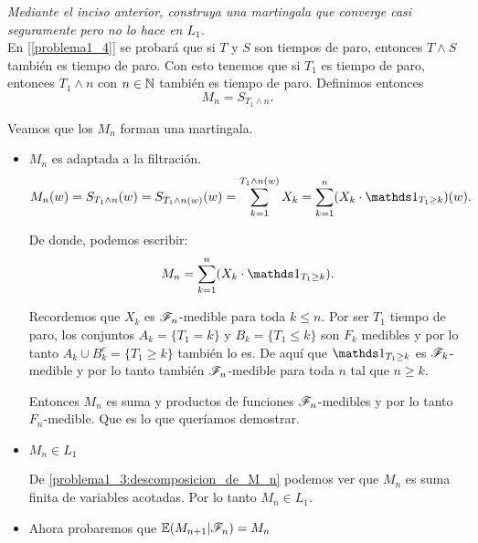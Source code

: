 \emph
{	
	Mediante el inciso anterior, construya una martingala que converge 
	casi seguramente pero no lo hace en $L_1$.\\
}
\afterstatement	
	En [\ref{problema1_4}] se probará que si $T$ y $S$ son tiempos de paro, entonces $T\wedge S$ también 
	es tiempo de paro. Con esto tenemos que si $T_1$ es tiempo de paro, entonces $T_1 \wedge n$ con 
	$n \in \mathbb{N}$ también es tiempo de paro. Definimos entonces 
	$$M_n = S_{T_1 \wedge n}.$$
	
	Veamos que los $M_n$ forman una martingala.
	
	\begin{itemize}
		\item 
			$M_n$ es adaptada a la filtración.
			\begin{align}
				M_n(w) = S_{T_1 \wedge n}(w) = 
				S_{T_1 \wedge n (w)}(w) = 
				\sum_{k=1}^{T_1 \wedge n (w)} X_k = 
				\sum_{k=1}^{n} (X_k \cdot \indic_{T_1 \geq k})(w).
			\end{align}
			
			De donde, podemos escribir:
			\begin{align}\label{problema1_3:descomposicion_de_M_n}
				M_n = \sum_{k=1}^{n} (X_k \cdot \indic_{T_1 \geq k}).
			\end{align}\pn							 		
			
			Recordemos que $X_k$ es $\mathscr{F}_n$-medible para toda $k \leq n $. Por ser
			$T_1$ tiempo de paro, los conjuntos $A_k = \{T_1 = k\}$ y 
			$B_k = \{T_1 \leq k\}$	son $F_k$ medibles y por lo tanto 
			$A_k \cup B_k^c = \{ T_1 \geq k\}$ también lo es. De aquí que 
			$\indic_{T_1 \geq k}$ es $\mathscr{F}_k$-medible y por lo tanto también $\mathscr{F}_n$-medible
			para toda $n$ tal que $n \geq k$.\pn
			  
			Entonces $M_n$ es suma y productos de funciones $\mathscr{F}_n$-medibles y por lo tanto
			$F_n$-medible. Que es lo que queríamos demostrar.\pn
			
		\item
			$M_n \in L_1$\pn
			
			De \eqref{problema1_3:descomposicion_de_M_n} podemos ver que $M_n$ es 
			suma finita de variables acotadas. Por lo tanto $M_n \in L_1$.\pn
			
		\item Ahora probaremos que	$\mathbb{E}(M_{n+1} | \mathscr{F}_{n}) = M_{n}$\pn
			

\end{itemize}
